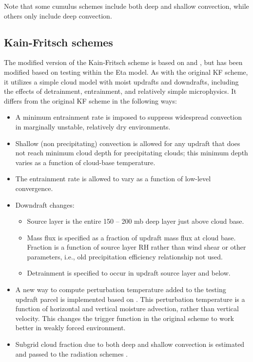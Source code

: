 Note that some cumulus schemes include both deep and shallow
convection, while others only include deep convection.
  
\subsection{Kain-Fritsch schemes}

The modified version of the Kain-Fritsch scheme \citep{kain04} is based on 
\citet{kain90} and \citet{kain93}, but has been modified based on 
testing within the Eta model. As with the original KF scheme, 
it utilizes a simple cloud model with moist updrafts and downdrafts, 
including the effects of detrainment, entrainment, and relatively 
simple microphysics. It differs from the original KF scheme in the following ways:

\begin{itemize}\setlength{\parskip}{-4pt}
\item
 A minimum entrainment rate is imposed to suppress widespread convection 
in marginally unstable, relatively dry environments.

\item
Shallow (non precipitating) convection is allowed for any updraft 
that does not reach minimum cloud depth for precipitating clouds; 
this minimum depth varies as a function of cloud-base temperature.

\item
The entrainment rate is allowed to vary as a function of low-level convergence.

\item
Downdraft changes:

\begin{itemize}\setlength{\parskip}{-4pt}
\item
Source layer is the entire 150 -- 200 mb deep layer just above cloud base.

\item
Mass flux is specified as a fraction of updraft mass flux at cloud base.
Fraction is a function of source layer RH rather than wind shear 
or other parameters, i.e., old precipitation efficiency relationship not used.

\item
Detrainment is specified to occur in updraft source layer and below.
\end{itemize}

\item
A new way to compute perturbation temperature added to the testing updraft 
parcel is implemented based on \citet{ma2009}. This perturbation temperature
is a function of horizontal and vertical moisture advection, rather than vertical
velocity. This changes the trigger function in the original scheme to work better
in weakly forced environment.

\item
Subgrid cloud fraction due to both deep and shallow convection is estimated and passed
to the radiation schemes \citep{alapaty12}.
\end{itemize}

